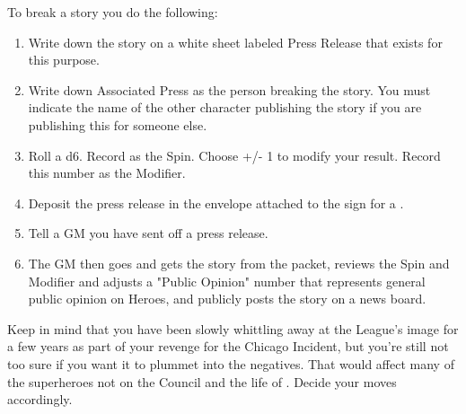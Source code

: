 \documentclass[green]{LRSguildcamp1}
\begin{document}
To break a story you do the following:
\begin{enumerate}
\item Write down the story on a white sheet labeled Press Release that exists for this purpose. 

\item Write down Associated Press as the person breaking the story. You must indicate the name of the other character publishing the story if you are publishing this for someone else. 

\item Roll a d6. Record as the Spin. Choose +/- 1 to modify your result. Record this number as the Modifier. 

\item Deposit the press release in the envelope attached to the sign for a \sWallPhone{}. 

\item Tell a GM you have sent off a press release.

\item The GM then goes and gets the story from the packet, reviews the Spin and Modifier and adjusts a "Public Opinion" number that represents general public opinion on Heroes, and publicly posts the story on a news board. 
\end{enumerate}

Keep in mind that you have been slowly whittling away at the League's image for a few years as part of your revenge for the Chicago Incident, but you're still not too sure if you want it to plummet into the negatives. That would affect many of the superheroes not on the Council and the life of \cYoungest{}.  Decide your moves accordingly.
\end{document}
